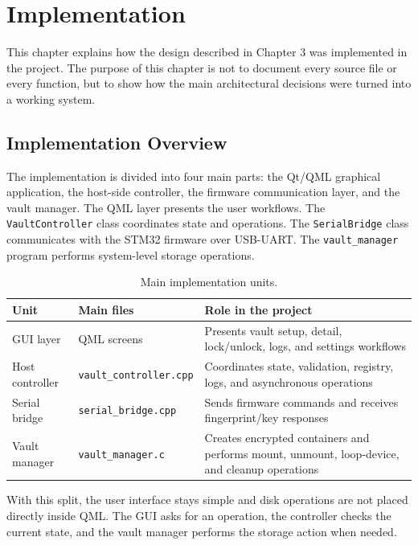 \chapter{Implementation}

This chapter explains how the design described in Chapter 3 was implemented in the project. The purpose of this chapter is not to document every source file or every function, but to show how the main architectural decisions were turned into a working system.

\section{Implementation Overview}

The implementation is divided into four main parts: the Qt/QML graphical application, the host-side controller, the firmware communication layer, and the vault manager. The QML layer presents the user workflows. The \texttt{VaultController} class coordinates state and operations. The \texttt{SerialBridge} class communicates with the STM32 firmware over USB-UART. The \texttt{vault\_manager} program performs system-level storage operations.

\begin{table}[!htbp]
\centering
\caption{\label{tab:implementation-units}Main implementation units.}
\small
\begin{tabularx}{\textwidth}{lXX}
\toprule
Unit & Main files & Role in the project\\
\midrule
GUI layer & QML screens & Presents vault setup, detail, lock/unlock, logs, and settings workflows\\
Host controller & \texttt{vault\_controller.cpp} & Coordinates state, validation, registry, logs, and asynchronous operations\\
Serial bridge & \texttt{serial\_bridge.cpp} & Sends firmware commands and receives fingerprint/key responses\\
Vault manager & \texttt{vault\_manager.c} & Creates encrypted containers and performs mount, unmount, loop-device, and cleanup operations\\
\bottomrule
\end{tabularx}
\end{table}

With this split, the user interface stays simple and disk operations are not placed directly inside QML. The GUI asks for an operation, the controller checks the current state, and the vault manager performs the storage action when needed.

